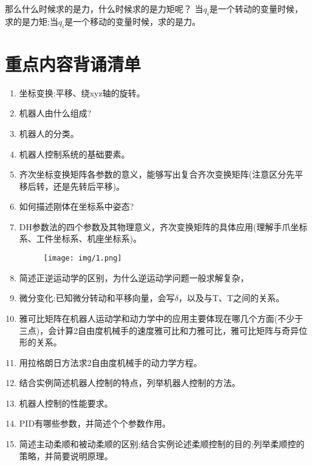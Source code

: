 \documentclass[12pt, a4paper, oneside]{ctexbook}
\begin{document}
那么什么时候求的是力，什么时候求的是力矩呢？
当$q_i$是一个转动的变量时候，求的是力矩;当$q_i$是一个移动的变量时候，求的是力。

\chapter{重点内容背诵清单}
\begin{enumerate}
	\item 坐标变换:平移、绕xyz轴的旋转。
	\item 机器人由什么组成?
	\item 机器人的分类。
	\item 机器人控制系统的基础要素。
	\item 齐次坐标变换矩阵各参数的意义，能够写出复合齐次变换矩阵(注意区分先平移后转，还是先转后平移)。
	\item 如何描述刚体在坐标系中姿态?
	\item DH参数法的四个参数及其物理意义，齐次变换矩阵的具体应用(理解手爪坐标系、工件坐标系、机座坐标系)。
	\begin{figure}[htbp]
		\centering
		\texttt{[image: img/1.png]}
	\end{figure}
	\item 简述正逆运动学的区别，为什么逆运动学问题一般求解复杂，
	\item 微分变化:已知微分转动和平移向量，会写$\delta$，以及与T、T之间的关系。
	\item 雅可比矩阵在机器人运动学和动力学中的应用主要体现在哪几个方面(不少于三点)，会计算2自由度机械手的速度雅可比和力雅可比，雅可比矩阵与奇异位形的关系。
	\item 用拉格朗日方法求2自由度机械手的动力学方程。
	\item 结合实例简述机器人控制的特点，列举机器人控制的方法。
	\item 机器人控制的性能要求。
	\item PID有哪些参数，并简述个个参数作用。
	\item 简述主动柔顺和被动柔顺的区别;结合实例论述柔顺控制的目的;列举柔顺控的策略，并简要说明原理。
\end{enumerate}
\end{document}
